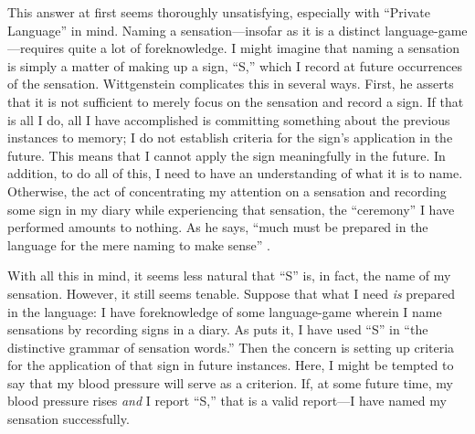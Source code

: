 \documentclass[man,12pt,natbib]{apa6}
\begin{document}
This answer at first seems thoroughly unsatisfying, especially with ``Private
Language'' in mind. Naming a sensation---insofar as it is a distinct
language-game---requires quite a lot of foreknowledge.  I might imagine that
naming a sensation is simply a matter of making up a sign, ``S,'' which I
record at future occurrences of the sensation. Wittgenstein complicates this in
several ways. First, he asserts that it is not sufficient to merely focus on
the sensation and record a sign. If that is all I do, all I have accomplished
is committing something about the previous instances to memory;
I do not establish criteria for the sign's application in the future. This
means that I cannot apply the sign meaningfully in the future.
In addition, to do all of this, I need to have an understanding of what it is
to name. Otherwise, the act of concentrating my attention on a sensation and
recording some sign in my diary while experiencing that sensation, the
``ceremony'' I have performed amounts to nothing. As he says, ``much must be
prepared in the language for the mere naming to make sense'' \cite[\S
257]{Wittgenstein53}.

With all this in mind, it seems less natural that ``S'' is, in fact, the name
of my sensation. However, it still seems tenable. Suppose that what I need
\emph{is} prepared in the language: I have foreknowledge
of some language-game wherein I name sensations by recording signs in a diary.
As \citet{McGinn97} puts it, I have used ``S'' in ``the distinctive grammar of
sensation words.'' Then the concern is setting up criteria for the application
of that sign in future instances.
%
Here, I might be tempted to say that my blood pressure
will serve as a criterion. If, at some future time, my blood pressure rises
\emph{and} I report ``S,'' that is a valid report---I have named my sensation
successfully.
\end{document}
